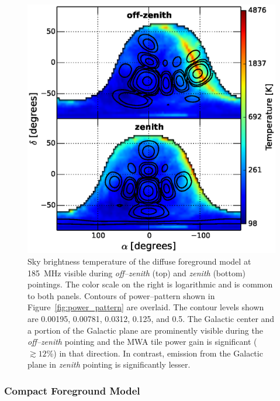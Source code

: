 \documentclass[preprint2,iop,numberedappendix]{emulateapj}
\begin{document}
\begin{figure}[htb]
\centering
\includegraphics[width=\linewidth]{f5.eps}
\caption{Sky brightness temperature of the diffuse foreground model at 185~MHz visible during {\it off--zenith} (top) and {\it zenith} (bottom) pointings. The color scale on the right is logarithmic and is common to both panels. Contours of power--pattern shown in Figure~\ref{fig:power_pattern} are overlaid. The contour levels shown are 0.00195, 0.00781, 0.0312, 0.125, and 0.5. The Galactic center and a portion of the Galactic plane are prominently visible during the {\it off--zenith} pointing and the MWA tile power gain is significant ($\gtrsim 12$\%) in that direction. In contrast, emission from the Galactic plane in {\it zenith} pointing is significantly lesser. \label{fig:DSM}}
\end{figure}

\subsubsection{Compact Foreground Model}\label{sec:CSM}
\end{document}
